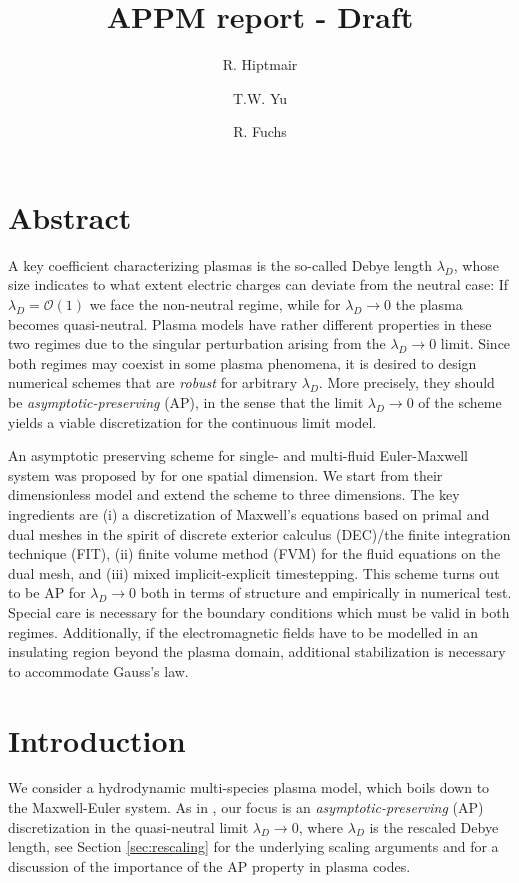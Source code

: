 \documentclass{article}
\title{APPM report - Draft}
\author[1]{R. Hiptmair}
\author[1]{T.W. Yu}
\author[2]{R. Fuchs}
\affil[1]{Seminar for Applied Mathematics , ETH Z\"{u}rich}
\affil[2]{IET Institut für Energietechnik, OST}
\date{}
\begin{document}
\maketitle

\section*{Abstract}
A key coefficient characterizing plasmas is the so-called Debye length $\lambda_D$, whose size indicates to what extent electric charges can deviate from the neutral case: If $\lambda_D = \mathcal{O}(1)$ we face the non-neutral regime, while for $\lambda_D\to 0$ the plasma becomes quasi-neutral. Plasma models have rather different properties in these two regimes due to the singular perturbation arising from the $\lambda_D\to 0$ limit.
Since both regimes may coexist in some plasma phenomena, it is desired to design numerical schemes that are \emph{robust} for arbitrary $\lambda_D$. More precisely, they should be \emph{asymptotic-preserving} (AP), in the sense that the limit $\lambda_D\to 0$ of the scheme yields a viable discretization for the continuous limit model.

An asymptotic preserving scheme for single- and multi-fluid Euler-Maxwell system was proposed by \cite{degond_2012} for one spatial dimension. We start from their dimensionless model and extend the scheme to three dimensions. The key ingredients are (i) a discretization of Maxwell's equations based on primal and dual meshes in the spirit of discrete exterior calculus (DEC)/the finite integration technique (FIT), (ii) finite volume method (FVM) for the fluid equations on the dual mesh, and (iii) mixed implicit-explicit timestepping. This scheme turns out to be AP for $\lambda_D\to 0$ both in terms of structure and empirically in numerical test. Special care is necessary for the boundary conditions which must be valid in both regimes. Additionally, if the electromagnetic fields have to be modelled in an insulating region beyond the plasma domain, additional stabilization is necessary to accommodate Gauss's law.

\section{Introduction}
We consider a hydrodynamic multi-species plasma model, which boils down to the Maxwell-Euler system. As in \cite{degond_2012}, our focus is an \emph{asymptotic-preserving} (AP) discretization in the quasi-neutral limit $\lambda_D \rightarrow 0$, where $\lambda_D$ is the rescaled Debye length, see Section \ref{sec:rescaling} for the underlying scaling arguments and \cite{degond_2012,degond_2017} for a discussion of the importance of the AP property in plasma codes.  
\end{document}
